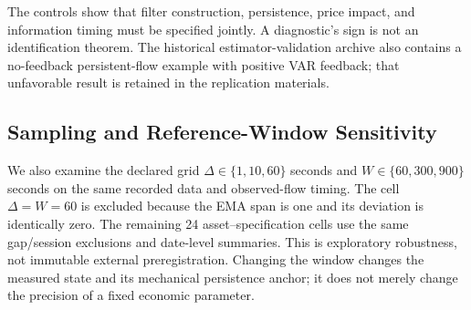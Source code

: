 \documentclass[12pt]{article}
\theoremstyle{definition}
\theoremstyle{remark}
\begin{document}
The controls show that filter construction, persistence, price impact, and information timing must be specified jointly. A diagnostic's sign is not an identification theorem. The historical estimator-validation archive also contains a no-feedback persistent-flow example with positive VAR feedback; that unfavorable result is retained in the replication materials.

\subsection{Sampling and Reference-Window Sensitivity}
We also examine the declared grid $\Delta\in\{1,10,60\}$ seconds and $W\in\{60,300,900\}$ seconds on the same recorded data and observed-flow timing. The cell $\Delta=W=60$ is excluded because the EMA span is one and its deviation is identically zero. The remaining 24 asset--specification cells use the same gap/session exclusions and date-level summaries. This is exploratory robustness, not immutable external preregistration. Changing the window changes the measured state and its mechanical persistence anchor; it does not merely change the precision of a fixed economic parameter.
\end{document}
